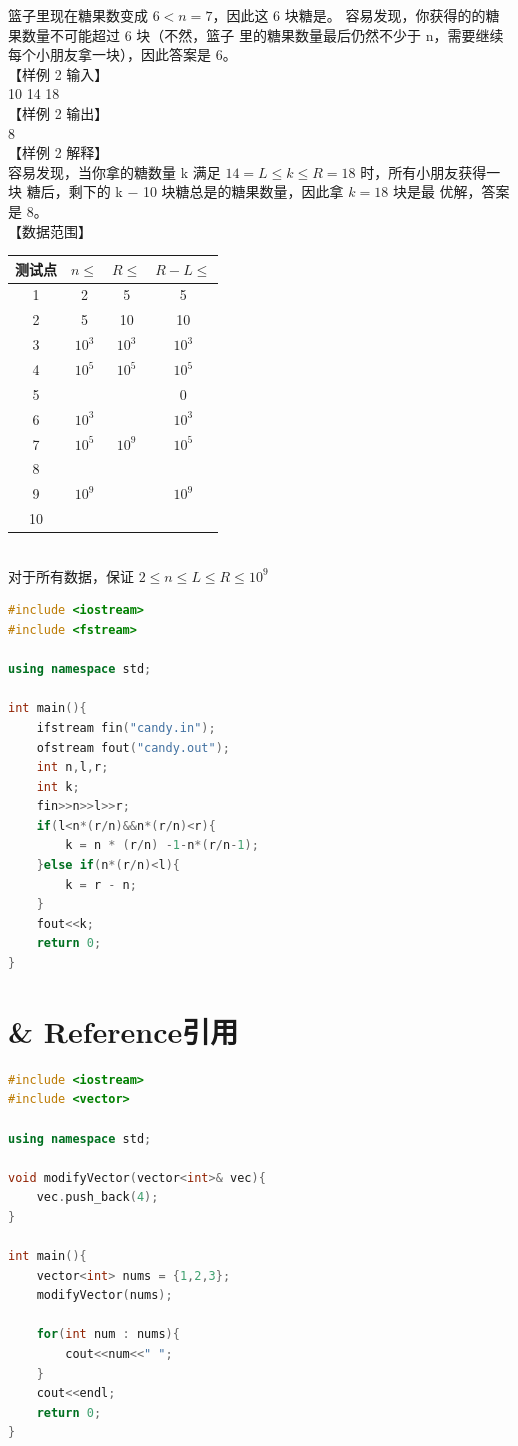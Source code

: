 \documentclass[12pt,twiside,a4paper]{ctexbook}
\numberwithin{chapter}{part}
\begin{document}
篮子里现在糖果数变成 $6 < n = 7$，因此这 6 块糖是。
容易发现，你获得的的糖果数量不可能超过 6 块（不然，篮子
里的糖果数量最后仍然不少于 n，需要继续每个小朋友拿一块），因此答案是 6。\\
【样例 2 输入】\\
10 14 18\\
【样例 2 输出】\\
8\\
【样例 2 解释】\\
容易发现，当你拿的糖数量 k 满足 $14 = L \leq k \leq R = 18$ 时，所有小朋友获得一块
糖后，剩下的 k − 10 块糖总是的糖果数量，因此拿 $k = 18$ 块是最
优解，答案是 8。\\
【数据范围】\\
\begin{tabular}{|c|c|c|c|}
  \hline
  测试点 &  $n\leq$ & $R\leq$ & $R-L\leq$\\
  \hline
  1 & 2 & 5 & 5\\
  \hline
  2 & 5 & 10 & 10\\
  \hline
  3 & $10^3$ & $10^3$ & $10^3$\\
  \hline
  4 & $10^5$ & $10^5$ & $10^5$\\
  \hline
  5 & & & 0\\
  \cline{1-1}
  \cline{4-1}
  6 & $10^3$ & & $10^3$\\
  \cline{1-1}
  \cline{2-1}
  \cline{4-1}
  7 & $10^5$ & $10^9$ & $10^5$\\
  \cline{1-1}
  \cline{2-1}
  \cline{4-1}
  8 & & & \\
  \cline{1-1}
  9 & $10^9$ & & $10^{9}$\\
  \cline{1-1}
  10 & & &\\
  \hline
\end{tabular}\\
对于所有数据，保证 $2 \leq n \leq L \leq R \leq 10^9$
\begin{lstlisting}[language=C++]
#include <iostream>
#include <fstream>

using namespace std;

int main(){
	ifstream fin("candy.in");
	ofstream fout("candy.out");
	int n,l,r;
	int k;
	fin>>n>>l>>r;
	if(l<n*(r/n)&&n*(r/n)<r){
		k = n * (r/n) -1-n*(r/n-1);
	}else if(n*(r/n)<l){
		k = r - n;
	}
	fout<<k;
	return 0;
}
\end{lstlisting}

\section{\& Reference引用}
\begin{lstlisting}[language=C++]
#include <iostream>
#include <vector>

using namespace std;

void modifyVector(vector<int>& vec){
	vec.push_back(4);
}

int main(){
	vector<int> nums = {1,2,3};
	modifyVector(nums);

	for(int num : nums){
		cout<<num<<" ";
	}
	cout<<endl;
	return 0;
}
\end{lstlisting}
\end{document}
